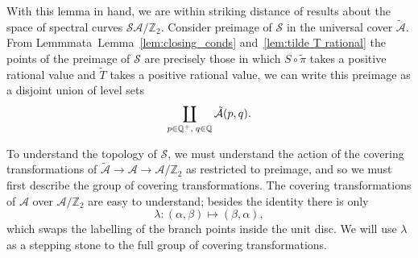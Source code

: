 \documentclass{article}
\begin{document}
With this lemma in hand, we are within striking distance of results about the space of spectral curves $\mathcal{S} \mathcal{A}/\mathbb{Z}_2$. Consider preimage of $\mathcal{S}$ in the universal cover $\mathcal{\tilde{A}}$. From Lemmmata~Lemma~\ref{lem:closing_conds} and~\ref{lem:tilde T rational} the points of the preimage of $\mathcal{S}$ are precisely those in which $S\circ\tilde{\pi}$ takes a positive rational value and $\tilde{T}$ takes a positive rational value, we can write this preimage as a disjoint union of level sets
\[
\coprod_{p\in \mathbb{Q}^+,\; q\in \mathbb{Q}} \mathcal{\tilde{A}}(p,q).
\]


To understand the topology of $\mathcal{S}$, we must understand the action of the covering transformations of $\mathcal{\tilde{A}} \to \mathcal{A} \to \mathcal{A}/\mathbb{Z}_2$ as restricted to preimage, and so we must first describe the group of covering transformations. The covering transformations of $\mathcal{A}$ over $\mathcal{A}/\mathbb{Z}_2$ are easy to understand; besides the identity there is only
\[
\lambda : (\alpha,\beta) \mapsto (\beta,\alpha),
\]
which swaps the labelling of the branch points inside the unit disc. We will use $\lambda$ as a stepping stone to the full group of covering transformations.


\end{document}
